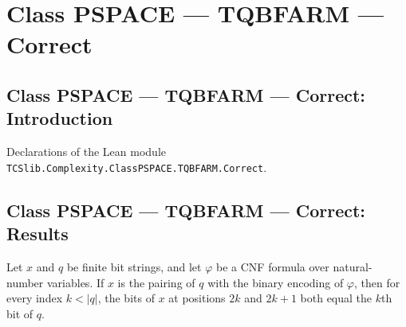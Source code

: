 \section{Class PSPACE --- TQBFARM --- Correct}
\subsection*{Class PSPACE --- TQBFARM --- Correct: Introduction}

Declarations of the Lean module \texttt{TCSlib.Complexity.ClassPSPACE.TQBFARM.Correct}.

\subsection*{Class PSPACE --- TQBFARM --- Correct: Results}

\begin{lemma}
\label{Complexity.LogProg.TQBFARM.getD_quant}
\leanok
{}
Let $x$ and $q$ be finite bit strings, and let $\varphi$ be a CNF formula over
natural-number variables. If $x$ is the pairing of $q$ with the binary encoding of
$\varphi$, then for every index $k<|q|$, the bits of $x$ at positions $2k$ and $2k+1$
both equal the $k$th bit of $q$.
\end{lemma}

